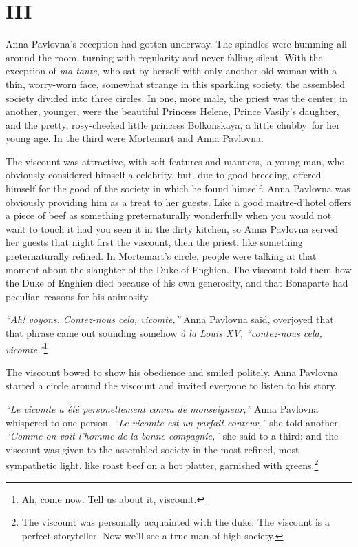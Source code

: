 \section{III} %

Anna Pavlovna's reception had gotten underway. The spindles were
humming all around the room, turning with regularity and never falling
silent. With the exception of \textit{ma tante}, who sat by herself
with only another old woman with a thin, worry-worn face, somewhat
strange in this sparkling society, the assembled society divided into
three circles. In one, more male, the priest was the center; in
another, younger, were the beautiful Princess Helene, Prince Vasily's
daughter, and the pretty, rosy-cheeked little princess Bolkonskaya, a
little chubby\ for her young age. In the third were Mortemart
and Anna Pavlovna.

The viscount was attractive, with soft features and manners,\
a young man, who obviously considered himself a celebrity, but, due to
good breeding, offered himself for the good of the society in which he
found himself. Anna Pavlovna was obviously providing him as a treat to
her guests. Like a good maitre-d'hotel offers a piece of beef as
something preternaturally wonderfully when you would not want to touch
it had you seen it in the dirty kitchen, so Anna Pavlovna served her
guests that night first the viscount, then the priest, like something
preternaturally refined. In Mortemart's circle, people were talking at
that moment about the slaughter of the Duke of Enghien. The viscount
told them how the Duke of Enghien died because of his own generosity,
and that Bonaparte had peculiar\todo{?}\ reasons for his animosity.

\textit{``Ah! voyons. Contez-nous cela, vicomte,''} Anna Pavlovna
said, overjoyed that that phrase came out sounding somehow \textit{\`a
  la Louis XV, ``contez-nous cela, vicomte.''}\footnote{Ah, come
  now. Tell us about it, viscount.}\todo{?}

The viscount bowed to show his obedience and smiled politely. Anna
Pavlovna started a circle around the viscount and invited everyone to
listen to his story.

\textit{``Le vicomte a \'et\'e personellement connu de monseigneur,''}
Anna Pavlovna whispered to one person. \textit{``Le vicomte est un
  parfait conteur,''} she told another. \textit{``Comme on voit
  l'homme de la bonne compagnie,''} she said to a third; and the
viscount was given to the assembled society in the most refined, most
sympathetic light, like roast beef on a hot platter, garnished with
greens.\footnote{The viscount was personally acquainted with the
  duke. The viscount is a perfect storyteller. Now we'll see a true
  man of high society.}

